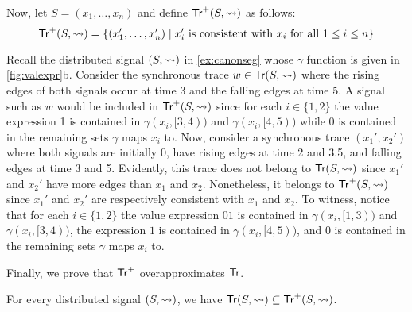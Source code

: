 Now, let $S = (x_1, \ldots, x_n)$ and define $\mathsf{Tr}^+(S,{\rightsquigarrow})$ as follows:
\[ \tr^+(S,{\hb}) = \{ (x_1', \ldots, x_n') \st \text{$x_i'$ is consistent with $x_i$ for all $1 \leq i \leq n$}\} \]



\begin{example} \label{ex:overapx}
	Recall the distributed signal $(S, {\rightsquigarrow})$ in \cref{ex:canonseg} whose $\gamma$ function is given in \cref{fig:valexpr}b.
	Consider the synchronous trace $w \in \mathsf{Tr}(S, {\rightsquigarrow})$ where the rising edges of both signals occur at time 3 and the falling edges at time 5.
	A signal such as $w$ would be included in $\mathsf{Tr}^+(S,{\rightsquigarrow})$ since for each $i \in \{1,2\}$ the value expression 1 is contained in $\gamma(x_i, [3,4))$ and $\gamma(x_i, [4,5))$ while 0 is contained in the remaining sets $\gamma$ maps $x_i$ to.
	Now, consider a synchronous trace $(x_1', x_2')$ where both signals are initially 0, have rising edges at time 2 and 3.5, and falling edges at time 3 and 5.
	Evidently, this trace does not belong to $\mathsf{Tr}(S, {\rightsquigarrow})$ since $x_1'$ and $x_2'$ have more edges than $x_1$ and $x_2$.
	Nonetheless, it belongs to $\mathsf{Tr}^+(S,{\rightsquigarrow})$ since $x_1'$ and $x_2'$ are respectively consistent with $x_1$ and $x_2$.
	To witness, notice that for each $i \in \{1,2\}$ the value expression $01$ is contained in $\gamma(x_i, [1,3))$ and $\gamma(x_i, [3,4))$, the expression $1$ is contained in $\gamma(x_i, [4,5))$, and 0 is contained in the remaining sets $\gamma$ maps $x_i$ to.
\end{example}

Finally, we prove that $\mathsf{Tr}^+$ overapproximates $\mathsf{Tr}$.

\begin{lemma} \label{cl:trsound}
	For every distributed signal $(S,{\rightsquigarrow})$, we have $\mathsf{Tr}(S,{\rightsquigarrow}) \subseteq \mathsf{Tr}^+(S,{\rightsquigarrow})$.
\end{lemma}

